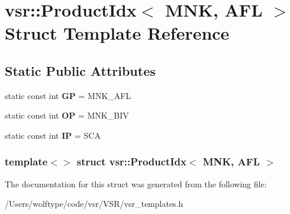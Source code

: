 \hypertarget{structvsr_1_1_product_idx_3_01_m_n_k_00_01_a_f_l_01_4}{\section{vsr\-:\-:Product\-Idx$<$ M\-N\-K, A\-F\-L $>$ Struct Template Reference}
\label{structvsr_1_1_product_idx_3_01_m_n_k_00_01_a_f_l_01_4}
}
\subsection*{Static Public Attributes}
\begin{DoxyCompactItemize}
\item 
\hypertarget{structvsr_1_1_product_idx_3_01_m_n_k_00_01_a_f_l_01_4_ad6651e7b46ee2fc8b5715e6de2ecee86}{static const int {\bfseries G\-P} = M\-N\-K\-\_\-\-A\-F\-L}\label{structvsr_1_1_product_idx_3_01_m_n_k_00_01_a_f_l_01_4_ad6651e7b46ee2fc8b5715e6de2ecee86}

\item 
\hypertarget{structvsr_1_1_product_idx_3_01_m_n_k_00_01_a_f_l_01_4_ac224f302d4a4e1e8eeb282de9ba20fde}{static const int {\bfseries O\-P} = M\-N\-K\-\_\-\-B\-I\-V}\label{structvsr_1_1_product_idx_3_01_m_n_k_00_01_a_f_l_01_4_ac224f302d4a4e1e8eeb282de9ba20fde}

\item 
\hypertarget{structvsr_1_1_product_idx_3_01_m_n_k_00_01_a_f_l_01_4_a477b7f40f84c6cb8bfd94fa8618c5096}{static const int {\bfseries I\-P} = S\-C\-A}\label{structvsr_1_1_product_idx_3_01_m_n_k_00_01_a_f_l_01_4_a477b7f40f84c6cb8bfd94fa8618c5096}

\end{DoxyCompactItemize}
\subsubsection*{template$<$$>$ struct vsr\-::\-Product\-Idx$<$ M\-N\-K, A\-F\-L $>$}



The documentation for this struct was generated from the following file\-:\begin{DoxyCompactItemize}
\item 
/\-Users/wolftype/code/vsr/\-V\-S\-R/vsr\-\_\-templates.\-h\end{DoxyCompactItemize}
